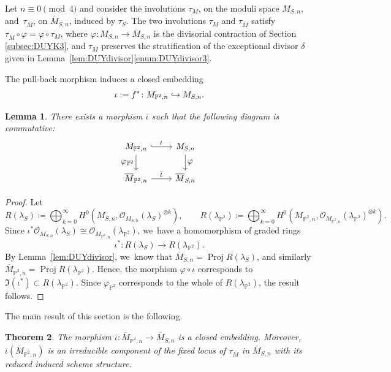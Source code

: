\documentclass[11pt]{article}
\let\ts\textstyle
\newcommand\hto{\mathrel{\lhook\joinrel\to}}
\newcommand{\PP}{{\mathbb P}}\let\P\PP
\newcommand\cO{\mathcal{O}}
\DeclareMathOperator{\Proj}{Proj}
\let\phi\varphi
\newtheorem{lemm}{Lemma}[section]
\newtheorem{theo}[lemm]{Theorem}
\theoremstyle{definition}
\begin{document}
Let $n\equiv 0 \pmod 4$ and consider the involutions $\tau_M$, on the moduli space $M_{S,n}$, and~$\tau_{\overline{M}}$, on $\overline{M}_{S,n}$, induced by
$\tau_S$.
The two involutions $\tau_M$ and $\tau_{\overline{M}}$ satisfy $\tau_{\overline{M}}\circ\phi=\phi\circ\tau_M$, where $\phi\colon M_{S,n}\to \overline{M}_{S,n}$ is the divisorial contraction of Section \ref{subsec:DUYK3}, and $\tau_M$ preserves the stratification of the exceptional divisor $\delta$ given in Lemma~\ref{lem:DUYdivisor}\ref{enum:DUYdivisor3}.

The pull-back morphism induces a closed embedding
\[
\iota:= f^*\colon M_{\PP^2,n} \hto M_{S,n}.
\]

\begin{lemm}
There exists a morphism $\overline{\iota}$ such that the following diagram is commutative:
\[
\begin{tikzcd}
M_{\PP^2, n}\arrow[hookrightarrow, r,"\ts\iota"] \arrow[d,"\ts\varphi_{\PP^2}"'] & M_{S, n} \arrow[d, "\ts\varphi"]\\
\overline{M}_{\PP^2, n}\arrow[r,"\ts\overline{\iota}"]& \overline{M}_{S, n}
\end{tikzcd}
\]
\end{lemm}

\begin{proof}
Let
\begin{equation*}
R(\lambda_S)\coloneqq \bigoplus_{k=0}^{\infty} H^0(M_{S,n},\cO_{M_{S,n}}(\lambda_S)^{\otimes k}),\qquad
R(\lambda_{\PP^2})\coloneqq \bigoplus_{k=0}^{\infty} H^0(M_{\PP^2,n},\cO_{M_{\PP^2,n}}(\lambda_{\PP^2})^{\otimes k}).
\end{equation*}
Since $\iota^{*}\cO_{M_{S,n}}(\lambda_S)\cong \cO_{M_{\PP^2,n}}(\lambda_{\PP^2})$, we~have a homomorphism of graded rings
\[
\iota^*\colon R(\lambda_S) \to R(\lambda_{\PP^2}).
\]
By Lemma~\ref{lem:DUYdivisor}, we~know that $\overline{M}_{S, n}=\Proj R(\lambda_S)$, and similarly $\overline{M}_{\PP^2, n}=\Proj R(\lambda_{\PP^2})$.
Hence, the morphism $\phi\circ\iota$ corresponds to $\Im(\iota^*)\subset R(\lambda_{\PP^2})$. Since $\phi_{\PP^2}$ corresponds to the whole of $R(\lambda_{\PP^2})$, the result follows.
\end{proof}

The main result of this section is the following.

\begin{theo}\label{thm:embedding}
The morphism $\overline{\iota}\colon \overline{M}_{\PP^2,n}\to \overline{M}_{S,n}$ is a closed embedding.
Moreover, $\overline{\iota}(\overline{M}_{\PP^2,n})$ is an irreducible component of the fixed locus of $\tau_{\overline{M}}$ in $\overline{M}_{S,n}$ with its reduced induced scheme structure.
\end{theo}
\end{document}
